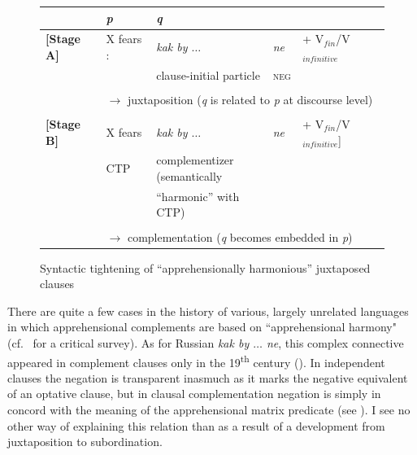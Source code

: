 \documentclass[output=paper,colorlinks,citecolor=brown]{langscibook}
\begin{document}
\begin{figure}[t]

\caption{Syntactic tightening of ``apprehensionally harmonious'' juxtaposed clauses}
\label{tab:syntactictightening}
\begin{tabular}{lllll}
\textit{}  & \textit{\textbf{p}} & \textit{\textbf{q}} &  & \\

\midrule

\textbf{{[}Stage A{]}} & X fears : & \textit{kak by  $\ldots$} & \textit{ne} & + V$_{fin}$/V$_{infinitive}$ \\
  &  &   {clause-initial particle} & \textsc{neg} & \\
\\
& \multicolumn{4}{l}{$\rightarrow$ juxtaposition (\textit{q} is related to \textit{p} at discourse level)} \\
\\

\textbf{{[}Stage B{]}} & X fears & \textit{kak by  $\ldots$} & \textit{ne} & + V$_{fin}$/V$_{infinitive}${]} \\
                 & CTP     & \multicolumn{2}{l}{complementizer (semantically} & \\
                 &    &  {``harmonic'' with CTP)} & \\
              \\
& \multicolumn{4}{l}{$\rightarrow$ complementation (\textit{q} becomes embedded in \textit{p})}
\end{tabular}
\end{figure}




 There are quite a few cases in the history of various, largely unrelated languages in which apprehensional complements are based on ``apprehensional harmony" (cf.\ \citealt{dobrushina2021} for a critical survey). As for Russian \textit{kak by $\ldots$ ne}, this complex connective appeared in complement clauses only in the 19\textsuperscript{th} century (\citealt[140--142]{dobrushina2021}). In independent clauses the negation is transparent inasmuch as it marks the negative equivalent of an optative clause, but in clausal complementation negation is simply in concord with the meaning of the apprehensional matrix predicate (see ). I see no other way of explaining this relation than as a result of a development from juxtaposition to subordination.
\end{document}
